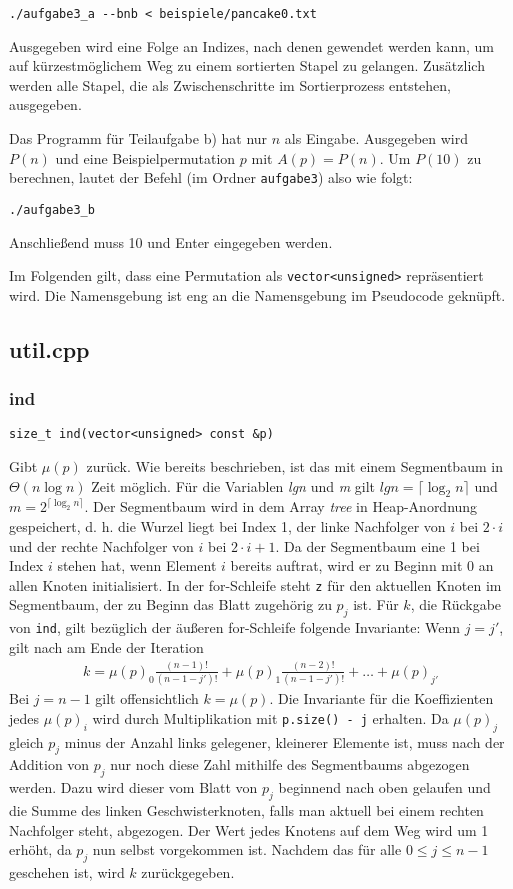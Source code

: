 \documentclass[a4paper, 10pt, ngerman]{article}
\begin{document}
\medskip
\verb|./aufgabe3_a --bnb < beispiele/pancake0.txt|
\medskip

Ausgegeben wird eine Folge an Indizes, nach denen gewendet werden kann, um auf kürzestmöglichem Weg zu einem sortierten Stapel zu gelangen. Zusätzlich werden alle Stapel, die als Zwischenschritte im Sortierprozess entstehen, ausgegeben.

Das Programm für Teilaufgabe b) hat nur $n$ als Eingabe. Ausgegeben wird $P(n)$ und eine Beispielpermutation $p$ mit $A(p) = P(n)$. Um $P(10)$ zu berechnen, lautet der Befehl (im Ordner \verb|aufgabe3|) also wie folgt:

\medskip
\verb|./aufgabe3_b|
\medskip

Anschließend muss 10 und Enter eingegeben werden.

Im Folgenden gilt, dass eine Permutation als \verb|vector<unsigned>| repräsentiert wird. Die Namensgebung ist eng an die Namensgebung im Pseudocode geknüpft.

\subsection{util.cpp}

\subsubsection{ind}
\verb|size_t ind(vector<unsigned> const &p)|
\medskip

\noindent Gibt $\mu(p)$ zurück. Wie bereits beschrieben, ist das mit einem Segmentbaum in $\Theta(n \log n)$ Zeit möglich. Für die Variablen \emph{lgn} und \emph{m} gilt $lgn = \lceil \log_2 n \rceil$ und $m = 2^{\lceil \log_2 n \rceil}$. Der Segmentbaum wird in dem Array \emph{tree} in Heap-Anordnung gespeichert, d. h. die Wurzel liegt bei Index 1, der linke Nachfolger von $i$ bei $2 \cdot i$ und der rechte Nachfolger von $i$ bei $2 \cdot i + 1$. Da der Segmentbaum eine 1 bei Index $i$ stehen hat, wenn Element $i$ bereits auftrat, wird er zu Beginn mit 0 an allen Knoten initialisiert. In der for-Schleife steht \verb|z| für den aktuellen Knoten im Segmentbaum, der zu Beginn das Blatt zugehörig zu $p_j$ ist. Für $k$, die Rückgabe von \verb|ind|, gilt bezüglich der äußeren for-Schleife folgende Invariante: Wenn $j = j'$, gilt nach am Ende der Iteration
\begin{align*}
    k = \mu(p)_0 \frac {(n - 1)!} {(n - 1 - j')!} + \mu(p)_1 \frac {(n - 2)!} {(n - 1 - j')!} + \dots + \mu(p)_{j'}
\end{align*}
Bei $j = n - 1$ gilt offensichtlich $k = \mu(p)$. Die Invariante für die Koeffizienten jedes $\mu(p)_i$ wird durch Multiplikation mit \verb|p.size() - j| erhalten. Da $\mu(p)_j$ gleich $p_j$ minus der Anzahl links gelegener, kleinerer Elemente ist, muss nach der Addition von $p_j$ nur noch diese Zahl mithilfe des Segmentbaums abgezogen werden. Dazu wird dieser vom Blatt von $p_j$ beginnend nach oben gelaufen und die Summe des linken Geschwisterknoten, falls man aktuell bei einem rechten Nachfolger steht, abgezogen. Der Wert jedes Knotens auf dem Weg wird um 1 erhöht, da $p_j$ nun selbst vorgekommen ist. Nachdem das für alle $0 \le j \le n - 1$ geschehen ist, wird $k$ zurückgegeben.
\end{document}
